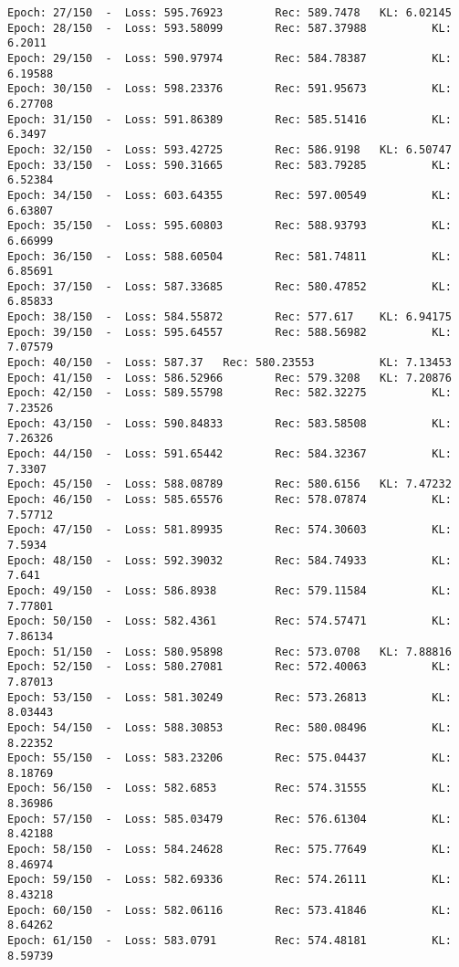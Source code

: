 \documentclass[11pt]{article}
\begin{document}
\begin{Verbatim}[commandchars=\\\{\}]
Epoch: 27/150  -  Loss: 595.76923        Rec: 589.7478   KL: 6.02145
Epoch: 28/150  -  Loss: 593.58099        Rec: 587.37988          KL: 6.2011
Epoch: 29/150  -  Loss: 590.97974        Rec: 584.78387          KL: 6.19588
Epoch: 30/150  -  Loss: 598.23376        Rec: 591.95673          KL: 6.27708
Epoch: 31/150  -  Loss: 591.86389        Rec: 585.51416          KL: 6.3497
Epoch: 32/150  -  Loss: 593.42725        Rec: 586.9198   KL: 6.50747
Epoch: 33/150  -  Loss: 590.31665        Rec: 583.79285          KL: 6.52384
Epoch: 34/150  -  Loss: 603.64355        Rec: 597.00549          KL: 6.63807
Epoch: 35/150  -  Loss: 595.60803        Rec: 588.93793          KL: 6.66999
Epoch: 36/150  -  Loss: 588.60504        Rec: 581.74811          KL: 6.85691
Epoch: 37/150  -  Loss: 587.33685        Rec: 580.47852          KL: 6.85833
Epoch: 38/150  -  Loss: 584.55872        Rec: 577.617    KL: 6.94175
Epoch: 39/150  -  Loss: 595.64557        Rec: 588.56982          KL: 7.07579
Epoch: 40/150  -  Loss: 587.37   Rec: 580.23553          KL: 7.13453
Epoch: 41/150  -  Loss: 586.52966        Rec: 579.3208   KL: 7.20876
Epoch: 42/150  -  Loss: 589.55798        Rec: 582.32275          KL: 7.23526
Epoch: 43/150  -  Loss: 590.84833        Rec: 583.58508          KL: 7.26326
Epoch: 44/150  -  Loss: 591.65442        Rec: 584.32367          KL: 7.3307
Epoch: 45/150  -  Loss: 588.08789        Rec: 580.6156   KL: 7.47232
Epoch: 46/150  -  Loss: 585.65576        Rec: 578.07874          KL: 7.57712
Epoch: 47/150  -  Loss: 581.89935        Rec: 574.30603          KL: 7.5934
Epoch: 48/150  -  Loss: 592.39032        Rec: 584.74933          KL: 7.641
Epoch: 49/150  -  Loss: 586.8938         Rec: 579.11584          KL: 7.77801
Epoch: 50/150  -  Loss: 582.4361         Rec: 574.57471          KL: 7.86134
Epoch: 51/150  -  Loss: 580.95898        Rec: 573.0708   KL: 7.88816
Epoch: 52/150  -  Loss: 580.27081        Rec: 572.40063          KL: 7.87013
Epoch: 53/150  -  Loss: 581.30249        Rec: 573.26813          KL: 8.03443
Epoch: 54/150  -  Loss: 588.30853        Rec: 580.08496          KL: 8.22352
Epoch: 55/150  -  Loss: 583.23206        Rec: 575.04437          KL: 8.18769
Epoch: 56/150  -  Loss: 582.6853         Rec: 574.31555          KL: 8.36986
Epoch: 57/150  -  Loss: 585.03479        Rec: 576.61304          KL: 8.42188
Epoch: 58/150  -  Loss: 584.24628        Rec: 575.77649          KL: 8.46974
Epoch: 59/150  -  Loss: 582.69336        Rec: 574.26111          KL: 8.43218
Epoch: 60/150  -  Loss: 582.06116        Rec: 573.41846          KL: 8.64262
Epoch: 61/150  -  Loss: 583.0791         Rec: 574.48181          KL: 8.59739

\end{Verbatim}
\end{document}
